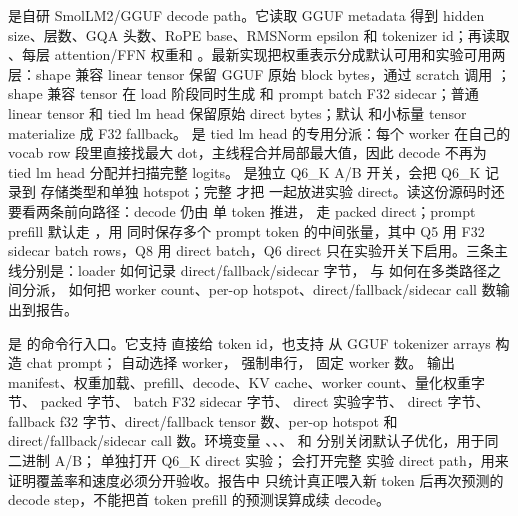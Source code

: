  是自研 SmolLM2/GGUF decode path。它读取 GGUF metadata 得到 hidden size、层数、GQA 头数、RoPE base、RMSNorm epsilon 和 tokenizer id；再读取 、每层 attention/FFN 权重和 。最新实现把权重表示分成默认可用和实验可用两层：shape 兼容  linear tensor 保留 GGUF 原始 block bytes，通过  scratch 调用 ；shape 兼容  tensor 在 load 阶段同时生成  和 prompt batch F32 sidecar；普通  linear tensor 和 tied  lm head 保留原始 direct bytes；默认  和小标量 tensor materialize 成 F32 fallback。 是 tied lm head 的专用分派：每个 worker 在自己的 vocab row 段里直接找最大 dot，主线程合并局部最大值，因此 decode 不再为 tied  lm head 分配并扫描完整 logits。 是独立 Q6\_K A/B 开关，会把 Q6\_K 记录到  存储类型和单独 hotspot；完整  才把  一起放进实验 direct。读这份源码时还要看两条前向路径：decode 仍由  单 token 推进， 走 packed direct；prompt prefill 默认走 ，用  同时保存多个 prompt token 的中间张量，其中 Q5 用 F32 sidecar batch rows，Q8 用 direct batch，Q6 direct 只在实验开关下启用。三条主线分别是：loader 如何记录 direct/fallback/sidecar 字节， 与  如何在多类路径之间分派， 如何把 worker count、per-op hotspot、direct/fallback/sidecar call 数输出到报告。



 是  的命令行入口。它支持  直接给 token id，也支持  从 GGUF tokenizer arrays 构造 chat prompt； 自动选择 worker， 强制串行， 固定 worker 数。 输出 manifest、权重加载、prefill、decode、KV cache、worker count、量化权重字节、 packed 字节、 batch F32 sidecar 字节、 direct 实验字节、 direct 字节、fallback f32 字节、direct/fallback tensor 数、per-op hotspot 和 direct/fallback/sidecar call 数。环境变量 、、、 和  分别关闭默认子优化，用于同二进制 A/B； 单独打开 Q6\_K direct 实验； 会打开完整  实验 direct path，用来证明覆盖率和速度必须分开验收。报告中  只统计真正喂入新 token 后再次预测的 decode step，不能把首 token prefill 的预测误算成续 decode。

